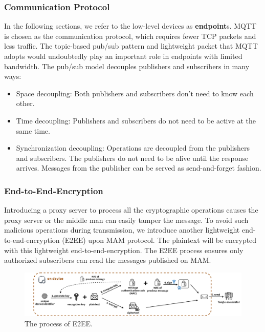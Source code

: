\documentclass[conference]{IEEEtran}
\begin{document}
\subsubsection{Communication Protocol}
In the following sections, we refer to the low-level devices as \textbf{endpoint}s. MQTT\cite{MQTT} is chosen as the communication protocol, which requires fewer TCP packets and less traffic. The topic-based pub/sub pattern and lightweight packet that MQTT adopts would undoubtedly play an important role in endpoints with limited bandwidth. The pub/sub model decouples publishers and subscribers in many ways:

\begin{itemize}
    \item Space decoupling: Both publishers and subscribers don't need to know each other.
    \item Time decoupling: Publishers and subscribers do not need to be active at the same time.
    \item Synchronization decoupling: Operations are decoupled from the publishers and subscribers. The publishers do not need to be alive until the response arrives. Messages from the publisher can be served as send-and-forget fashion.
\end{itemize}

\subsubsection{End-to-End-Encryption}
Introducing a proxy server to process all the cryptographic operations causes the proxy server or the middle man can easily tamper the message. To avoid such malicious operations during transmission, we introduce another lightweight end-to-end-encryption (E2EE) upon MAM protocol. The plaintext will be encrypted with this lightweight end-to-end-encryption. The E2EE process ensures only authorized subscribers can read the messages published on MAM.

\begin{figure}[!t]
    \centering
    \includegraphics[width=\linewidth]{MAM_E2EE}
    \caption{The process of E2EE.}
    \label{fig:MAM_E2EE}
\end{figure}
\end{document}
